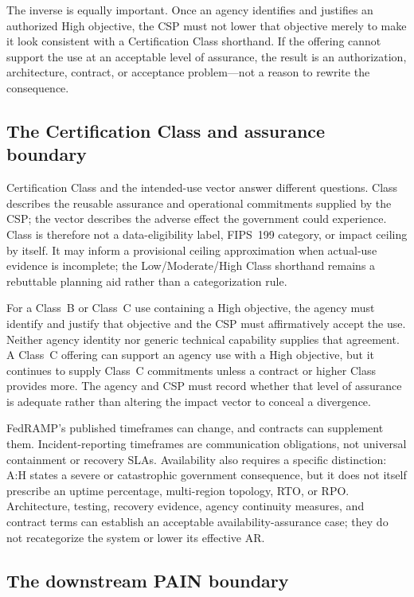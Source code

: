 \documentclass[11pt]{article}
\begin{document}
The inverse is equally important. Once an agency identifies and justifies an
authorized High objective, the CSP must not lower that objective merely to make it
look consistent with a Certification Class shorthand. If the offering cannot
support the use at an acceptable level of assurance, the result is an
authorization, architecture, contract, or acceptance problem---not a reason to
rewrite the consequence.

\subsection{The Certification Class and assurance boundary}

Certification Class and the intended-use vector answer different questions. Class
describes the reusable assurance and operational commitments supplied by the CSP;
the vector describes the adverse effect the government could experience. Class is
therefore not a data-eligibility label, FIPS~199 category, or impact ceiling by
itself. It may inform a provisional ceiling approximation when actual-use evidence
is incomplete; the Low/Moderate/High Class shorthand remains a rebuttable planning
aid rather than a categorization rule.

For a Class~B or Class~C use containing a High objective, the agency must identify
and justify that objective and the CSP must affirmatively accept the use. Neither
agency identity nor generic technical capability supplies that agreement. A Class~C
offering can support an agency use with a High objective, but it continues to
supply Class~C commitments unless a contract or higher Class provides more. The
agency and CSP must record whether that level of assurance is adequate rather than
altering the impact vector to conceal a divergence.

FedRAMP's published timeframes can change, and contracts can supplement them.
Incident-reporting timeframes are communication obligations, not universal
containment or recovery SLAs. Availability also requires a specific distinction:
A:H states a severe or catastrophic government consequence, but it does not itself
prescribe an uptime percentage, multi-region topology, RTO, or RPO. Architecture,
testing, recovery evidence, agency continuity measures, and contract terms can
establish an acceptable availability-assurance case; they do not recategorize the
system or lower its effective AR.

\subsection{The downstream PAIN boundary}
\end{document}

